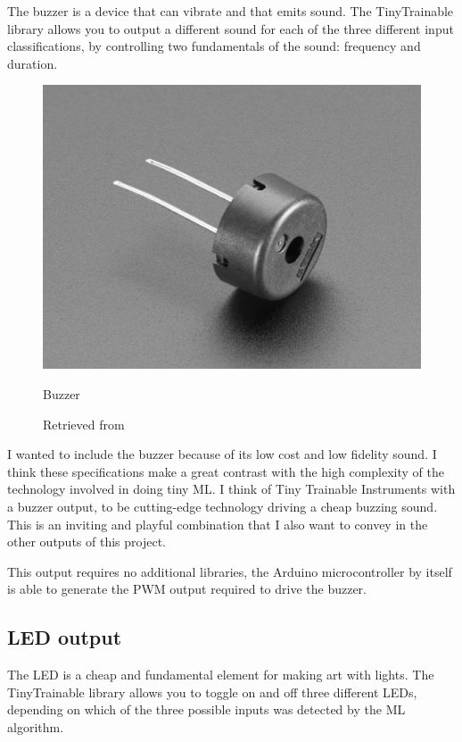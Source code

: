 The buzzer is a device that can vibrate and that emits sound. The TinyTrainable library allows you to output a different sound for each of the three different input classifications, by controlling two fundamentals of the sound: frequency and duration.

\begin{figure}[ht]
  \centering
  \includegraphics[width=0.75\linewidth,height=0.25\textheight,keepaspectratio]{images/materials-adafruit-buzzer.jpg}
  \caption{Buzzer}
  \caption*{Retrieved from \cite{website-materials-adafruit-buzzer}}
  \label{fig:materials-adafruit-buzzer}
\end{figure}

I wanted to include the buzzer because of its low cost and low fidelity sound. I think these specifications make a great contrast with the high complexity of the technology involved in doing tiny \acrshort{ML}. I think of Tiny Trainable Instruments with a buzzer output, to be cutting-edge technology driving a cheap buzzing sound. This is an inviting and playful combination that I also want to convey in the other outputs of this project.

This output requires no additional libraries, the Arduino microcontroller by itself is able to generate the \acrfull{PWM} output required to drive the buzzer.

\subsection{LED output}

The \acrfull{LED} is a cheap and fundamental element for making art with lights. The TinyTrainable library allows you to toggle on and off three different LEDs, depending on which of the three possible inputs was detected by the \acrshort{ML} algorithm.


